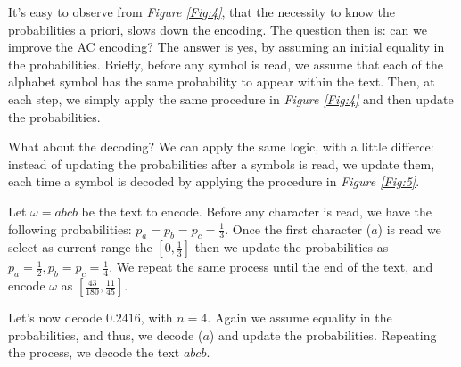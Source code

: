 \documentclass{subfiles}
\begin{document}
    It's easy to observe from \emph{Figure \ref{Fig:4}}, 
    that the necessity to know the probabilities a priori,
    slows down the encoding. 
    The question then is: can we improve the AC encoding? 
    The answer is yes, by assuming an initial equality in the probabilities.
    Briefly, before any symbol is read, 
    we assume that each of the alphabet symbol has the same probability to appear within the text.
    Then, at each step, we simply apply the same procedure in \emph{Figure \ref{Fig:4}}
    and then update the probabilities.

    What about the decoding? We can apply the same logic, with a little differce:
    instead of updating the probabilities after a symbols is read, we update them,
    each time a symbol is decoded by applying the procedure in \emph{Figure \ref{Fig:5}}.

    \begin{example*}
        Let \(\omega = abcb\) be the text to encode. 
        Before any character is read, we have the following probabilities: 
        \(p_{a} = p_{b} = p_{c} = \tfrac{1}{3}\).
        Once the first character (\(a\)) is read we select as current range 
        the \([0, \tfrac{1}{3}]\) then we update the probabilities as 
        \(p_{a} = \tfrac{1}{2}, p_{b} = p_{c} = \tfrac{1}{4}\).
        We repeat the same process until the end of the text,
            and encode \(\omega\) as \([\tfrac{43}{180}, \tfrac{11}{45}]\).
        

        Let's now decode \(0.2416\), with \(n = 4\).
        Again we assume equality in the probabilities, 
            and thus, we decode (\(a\)) and update the probabilities.
            Repeating the process, we decode the text \(abcb\).
        
    \end{example*}
\end{document}
